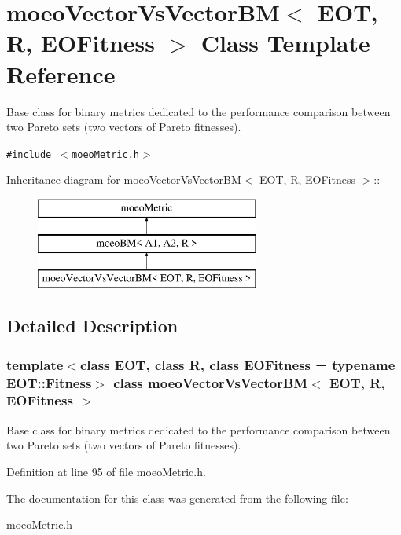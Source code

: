 \section{moeo\-Vector\-Vs\-Vector\-BM$<$ EOT, R, EOFitness $>$ Class Template Reference}
\label{classmoeoVectorVsVectorBM}
Base class for binary metrics dedicated to the performance comparison between two Pareto sets (two vectors of Pareto fitnesses).  


{\tt \#include $<$moeo\-Metric.h$>$}

Inheritance diagram for moeo\-Vector\-Vs\-Vector\-BM$<$ EOT, R, EOFitness $>$::\begin{figure}[H]
\begin{center}
\leavevmode
\includegraphics[height=3cm]{classmoeoVectorVsVectorBM}
\end{center}
\end{figure}


\subsection{Detailed Description}
\subsubsection*{template$<$class EOT, class R, class EOFitness = typename EOT::Fitness$>$ class moeo\-Vector\-Vs\-Vector\-BM$<$ EOT, R, EOFitness $>$}

Base class for binary metrics dedicated to the performance comparison between two Pareto sets (two vectors of Pareto fitnesses). 



Definition at line 95 of file moeo\-Metric.h.

The documentation for this class was generated from the following file:\begin{CompactItemize}
\item 
moeo\-Metric.h\end{CompactItemize}
